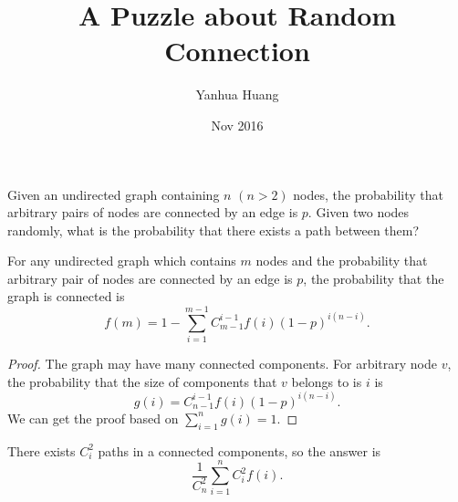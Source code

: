 \documentclass[a4paper,11pt]{article}
\begin{document}
\title{A Puzzle about Random Connection}
\author{Yanhua Huang}
\date{Nov 2016}
\maketitle

Given an undirected graph containing $n$ $(n > 2)$ nodes, the probability that arbitrary pairs of nodes are connected by an edge is $p$. Given two nodes randomly, what is the probability that there exists a path between them?


\begin{lemma}
For any undirected graph which contains $m$ nodes and the probability that arbitrary pair of nodes are connected by an edge is $p$, the probability that the graph is connected is 
\begin{equation}
f(m) = 1 - \sum_{i=1}^{m-1}C_{m-1}^{i-1}f(i)(1 - p) ^ {i(n-i)}.
\end{equation}
\end{lemma}

\begin{proof}
The graph may have many connected components. For arbitrary node $v$, the probability that the size of components that $v$ belongs to is $i$ is 
\begin{equation}
g(i) = C_{n-1}^{i-1}f(i)(1 - p)^{i(n-i)} .
\end{equation}
We can get the proof based on $\sum_{i=1}^{n}g(i) = 1$.
\end{proof}


There exists $C_{i}^2$ paths in a connected components, so the answer is
\begin{equation}
\frac{1}{C_{n}^{2}}\sum_{i=1}^{n}C_{i}^{2}f(i).
\end{equation}
\end{document}
